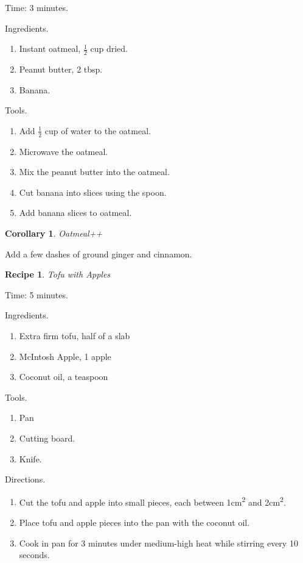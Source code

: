 \documentclass[twocolumn]{amsart}
\newtheorem{rec}{Recipe}
\newtheorem{cor}{Corollary}
\begin{document}
Time: 3 minutes.

Ingredients.
\begin{enumerate}
	\item Instant oatmeal, $\frac{1}{2}$ cup dried.
	\item Peanut butter, 2 tbsp.
	\item Banana.
\end{enumerate}

Tools.
\begin{enumerate}
	\item Add $\frac{1}{2}$ cup of water to the oatmeal.
	\item Microwave the oatmeal.
	\item Mix the peanut butter into the oatmeal.
	\item Cut banana into slices using the spoon.
	\item Add banana slices to oatmeal.
\end{enumerate}

\vspace{1em}
\begin{cor} Oatmeal++ \end{cor}
Add a few dashes of ground ginger and cinnamon.

\vspace{3em}

\begin{rec} Tofu with Apples \end{rec}

Time: 5 minutes.

Ingredients.
\begin{enumerate}
	\item Extra firm tofu, half of a slab
	\item McIntosh Apple, 1 apple
	\item Coconut oil, a teaspoon
\end{enumerate}

Tools.
\begin{enumerate}
	\item Pan
	\item Cutting board.
	\item Knife.
\end{enumerate}

Directions.
\begin{enumerate}
	\item Cut the tofu and apple into small pieces, each between
		1cm\textsuperscript{2} and 2cm\textsuperscript{2}.
	\item Place tofu and apple pieces into the pan with the coconut oil.
	\item Cook in pan for 3 minutes under medium-high heat while stirring
		every 10 seconds.
\end{enumerate}
\end{document}
